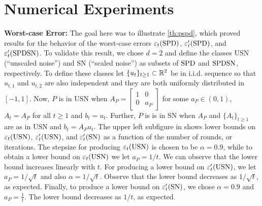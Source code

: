 \section{Numerical Experiments}\label{sec:exp}

\textbf{Worst-case Error:}
The goal here was to illustrate \cref{th:pspd}, which 
proved results for the behavior
of the worst-case errors $\varepsilon_t(\mathrm{SPD})$, $\varepsilon_t'(\mathrm{SPD})$, and $\varepsilon_t'(\mathrm{SPDSN})$.
To validate this result, we chose $d=2$ and define the classes $\text{USN}$ (``unscaled noise'') and $\text{SN}$ (``scaled noise'') as subsets of $\mathrm{SPD}$ and $\mathrm{SPDSN}$, respectively. 
To define these classes let $\{u_t\}_{t\ge 1}\subset \mathbb{R}^2$ be in i.i.d. sequence so that $u_{t,1}$ and $u_{t,2}$ are also independent and they are both uniformly distributed in $[-1,1]$.
Now, $P$ is in $\text{USN}$ when $A_P=\left[\begin{matrix}1 &0\\ 0 & a_P\end{matrix}\right]$ for some $a_P\in (0,1)$,
$A_t = A_P$ for all $t\ge 1$ and $b_t = u_t$.
Further, $P$ is is in $\text{SN}$ when $A_P$ and $\{A_t\}_{t\ge 1}$ are as in $\text{USN}$ and $b_t = A_P u_t$.
The upper left subfigure in  shows lower bounds on $\varepsilon_t(\text{USN})$, $\varepsilon_t'(\text{USN})$, 
and $\varepsilon_t'(\text{SN})$ as a function of the number of rounds, or iterations.
The stepsize for producing $\varepsilon_t(\text{USN})$ is chosen to be $\alpha = 0.9$, while to obtain a lower bound on $\varepsilon_t(\text{USN})$ we let $a_P=1/t$. We can observe that the lower bound increases linearly with $t$.
For producing a lower bound on $\varepsilon_t'(\text{USN})$, we let $a_P = 1/\sqrt{t}$ and also $\alpha = 1/\sqrt{t}$.
Observe that the lower bound decreases as $1/\sqrt{t}$, as expected.
Finally, to produce a lower bound on $\varepsilon_t'(\text{SN})$, we chose $\alpha = 0.9$ and $a_P = \frac{1}{t}$. 
The lower bound decreases as $1/t$, as expected.

